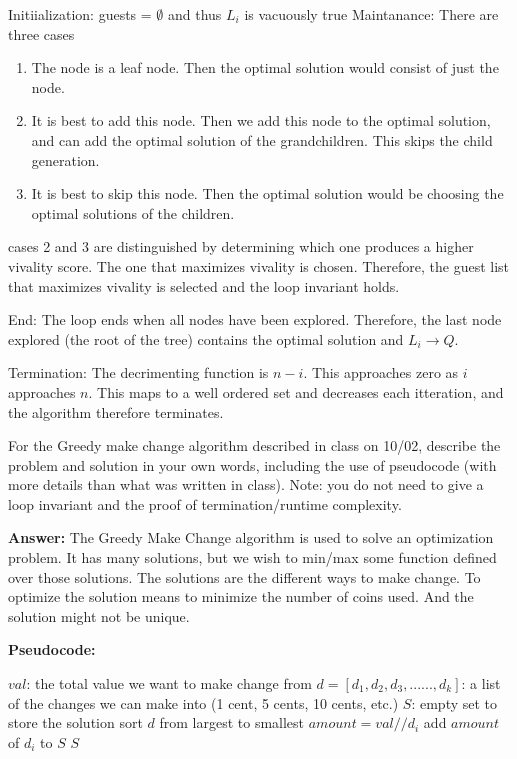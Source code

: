\documentclass{article}
\begin{document}
 Initiialization: guests = $\emptyset$ and thus $L_i$ is vacuously true
 Maintanance: There are three cases
 \begin{enumerate}[1.]
 \item The node is a leaf node. Then the optimal solution would consist of just the node.
 \item It is best to add this node. Then we add this node to the optimal solution, and can add the optimal solution of the grandchildren. This skips the child generation.
 \item It is best to skip this node. Then the optimal solution would be choosing the optimal solutions of the children.
 \end{enumerate}
 cases 2 and 3 are distinguished by determining which one produces a higher vivality score. The one that maximizes vivality is chosen. Therefore, the guest list that maximizes vivality is selected and the loop invariant holds.
 
 End: The loop ends when all nodes have been explored. Therefore, the last node explored (the root of the tree) contains the optimal solution and $L_i \rightarrow Q$.
 
 Termination: The decrimenting function is $n - i$. This approaches zero as $i$
 approaches $n$. This maps to a well ordered set and decreases each itteration, and the algorithm therefore terminates.


\nextprob
For the Greedy make change algorithm described in class on 10/02, describe the
problem and solution in your own words, including the use of pseudocode (with
more details than what was written in class).  Note: you do not need to give a
loop invariant and the proof of termination/runtime complexity.

\textbf{Answer:} The Greedy Make Change algorithm is used to solve an optimization problem. It has many solutions, but we wish to min/max some function defined over those solutions. The solutions are the different ways to make change. To optimize the solution means to minimize the number of coins used. And the solution might not be unique.

\textbf{Pseudocode:}
\begin{algorithm}
            \begin{algorithmic}
            \State $val$: the total value we want to make change from
            \State $d = [d_1, d_2, d_3, ......, d_k]$: a list of the changes we can make into (1 cent, 5 cents, 10 cents, etc.)
                    \State $S$: empty set to store the solution
                    \State sort $d$ from largest to smallest
                        \State $amount = val // d_i$
                        \State add $amount$ of $d_i$ to $S$  
                    \EndFor
                    \newline
                    \Return $S$
                \EndFunction
            \end{algorithmic}
            \end{algorithm}
\end{document}
